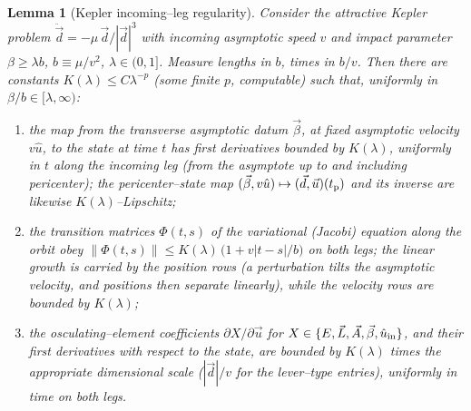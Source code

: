 \documentclass[11pt]{article}
\newtheorem{lemma}{Lemma}
\begin{document}
\begin{lemma}[Kepler incoming--leg regularity]
\label{lem:kepler-reg}
Consider the attractive Kepler problem $\ddot{\vec d}=-\mu\,\vec d/|\vec d|^3$ with incoming
asymptotic speed $v$ and impact parameter $\beta\ge\lambda b$, $b\equiv\mu/v^2$, $\lambda\in(0,1]$.
Measure lengths in $b$, times in $b/v$. Then there are constants $K(\lambda)\le C\lambda^{-p}$
(some finite $p$, computable) such that, uniformly in $\beta/b\in[\lambda,\infty)$:
\begin{enumerate}
\item the map from the transverse asymptotic datum $\vec\beta$, at fixed asymptotic velocity
$v\hat u$, to the state at time $t$ has first derivatives bounded by $K(\lambda)$, uniformly in
$t$ along the incoming leg (from the asymptote up to and including pericenter); the
pericenter--state map $(\vec\beta,v\hat u)\mapsto(\vec d,\vec u)(t_{\rm p})$ and its inverse are
likewise $K(\lambda)$--Lipschitz;
\item the transition matrices $\Phi(t,s)$ of the variational (Jacobi) equation along the orbit
obey $\|\Phi(t,s)\|\le K(\lambda)\,\big(1+v|t-s|/b\big)$ on both legs; the linear growth is
carried by the position rows (a perturbation tilts the asymptotic velocity, and positions then
separate linearly), while the velocity rows are bounded by $K(\lambda)$;
\item the osculating--element coefficients $\partial X/\partial\vec u$ for
$X\in\{E,\vec L,\vec A,\vec\beta,\hat u_{\rm in}\}$, and their first derivatives with respect to the
state, are bounded by $K(\lambda)$ times the appropriate dimensional scale
($|\vec d|/v$ for the lever--type entries), uniformly in time on both legs.
\end{enumerate}
\end{lemma}
\end{document}
